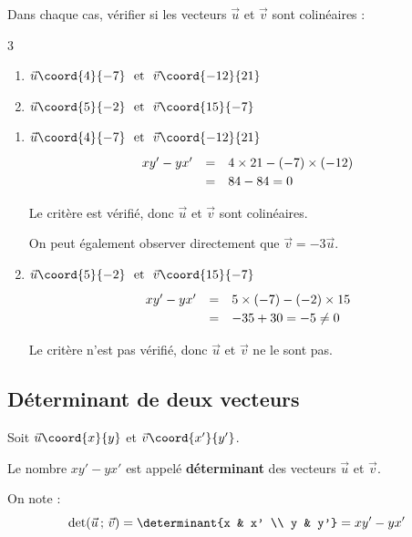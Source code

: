 \begin{methode}
	Dans chaque cas, vérifier si les vecteurs $\vec{u}$ et $\vec{v}$ sont colinéaires :
	\begin{multicols}{3}
		\begin{enumerate}
			\item $\vec{u}\coord{4}{-7}\ \text{ et }\ \vec{v}\coord{-12}{21}$
			\item $\vec{u}\coord{5}{-2}\ \text{ et }\ \vec{v}\coord{15}{-7}$
		\end{enumerate}
	\end{multicols}

	\begin{correction}
		\nline
		\begin{enumerate}[itemsep=2mm]
			\item $\vec{u}\coord{4}{-7}\ \text{ et }\ \vec{v}\coord{-12}{21}$
			      \[
				      \def\arraystretch{1.2}\begin{array}{rcl} xy' - yx' & = & 4\times 21 - (-7)\times(-12)\\ & = & 84 - 84 = 0\end{array}
			      \]

			      Le critère est vérifié, donc $\vec{u}$ et $\vec{v}$ sont colinéaires.

			      On peut également observer directement que $\vec{v} = -3\vec{u}$.

			\item $\vec{u}\coord{5}{-2}\ \text{ et }\ \vec{v}\coord{15}{-7}$
			      \[
				      \def\arraystretch{1.2} \begin{array}{rcl} xy' - yx' & = & 5\times(-7) - (-2)\times 15 \\ & = & -35 + 30 = -5 \neq 0 \end{array}
			      \]

			      Le critère n'est pas vérifié, donc $\vec{u}$ et $\vec{v}$ ne le sont pas.
		\end{enumerate}
	\end{correction}
\end{methode}

\subsection{Déterminant de deux vecteurs}

\begin{defin}[Déterminant]
	Soit $\vec{u}\coord{x}{y}$ et $\vec{v}\coord{x'}{y'}$.

	Le nombre $xy' - yx'$ est appelé \textbf{déterminant} des vecteurs $\vec{u}$ et $\vec{v}$.

	On note :
	\[
		\det(\vec{u}\,;\,\vec{v}) = \determinant{x & x' \\ y & y'} = xy' - yx'
	\]
\end{defin}

